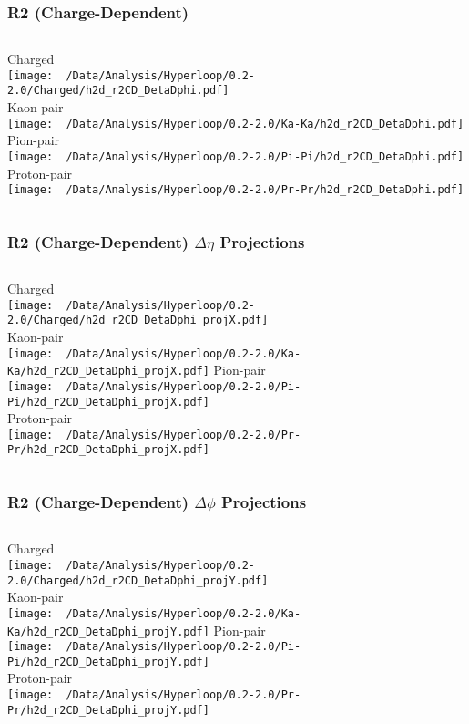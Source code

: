 \documentclass{beamer}
\begin{document}
\begin{frame}
	\frametitle{R2 (Charge-Dependent)}
	\begin{columns}
		\centering
		Charged\\
		\texttt{[image: ~/Data/Analysis/Hyperloop/0.2-2.0/Charged/h2d\_r2CD\_DetaDphi.pdf]}\\Kaon-pair\\
		\texttt{[image: ~/Data/Analysis/Hyperloop/0.2-2.0/Ka-Ka/h2d\_r2CD\_DetaDphi.pdf]}
		\centering
		Pion-pair\\
		\texttt{[image: ~/Data/Analysis/Hyperloop/0.2-2.0/Pi-Pi/h2d\_r2CD\_DetaDphi.pdf]}\\Proton-pair\\
		\texttt{[image: ~/Data/Analysis/Hyperloop/0.2-2.0/Pr-Pr/h2d\_r2CD\_DetaDphi.pdf]}
	\end{columns}
\end{frame}
\begin{frame}
	\frametitle{R2 (Charge-Dependent) $\Delta\eta$ Projections}
	\begin{columns}
		\column{0.5\textwidth}
		\centering
		Charged\\
		\texttt{[image: ~/Data/Analysis/Hyperloop/0.2-2.0/Charged/h2d\_r2CD\_DetaDphi\_projX.pdf]}\\Kaon-pair\\
		\texttt{[image: ~/Data/Analysis/Hyperloop/0.2-2.0/Ka-Ka/h2d\_r2CD\_DetaDphi\_projX.pdf]}
		\column{0.5\textwidth}
		\centering
		Pion-pair\\
		\texttt{[image: ~/Data/Analysis/Hyperloop/0.2-2.0/Pi-Pi/h2d\_r2CD\_DetaDphi\_projX.pdf]}\\Proton-pair\\
		\texttt{[image: ~/Data/Analysis/Hyperloop/0.2-2.0/Pr-Pr/h2d\_r2CD\_DetaDphi\_projX.pdf]}
	\end{columns}
\end{frame}
\begin{frame}
	\frametitle{R2 (Charge-Dependent) $\Delta\phi$ Projections}
	\begin{columns}
		\centering
		Charged\\
		\texttt{[image: ~/Data/Analysis/Hyperloop/0.2-2.0/Charged/h2d\_r2CD\_DetaDphi\_projY.pdf]}\\Kaon-pair\\
		\texttt{[image: ~/Data/Analysis/Hyperloop/0.2-2.0/Ka-Ka/h2d\_r2CD\_DetaDphi\_projY.pdf]}
		\centering
		Pion-pair\\
		\texttt{[image: ~/Data/Analysis/Hyperloop/0.2-2.0/Pi-Pi/h2d\_r2CD\_DetaDphi\_projY.pdf]}\\Proton-pair\\
		\texttt{[image: ~/Data/Analysis/Hyperloop/0.2-2.0/Pr-Pr/h2d\_r2CD\_DetaDphi\_projY.pdf]}
	\end{columns}
\end{frame}
\end{document}

